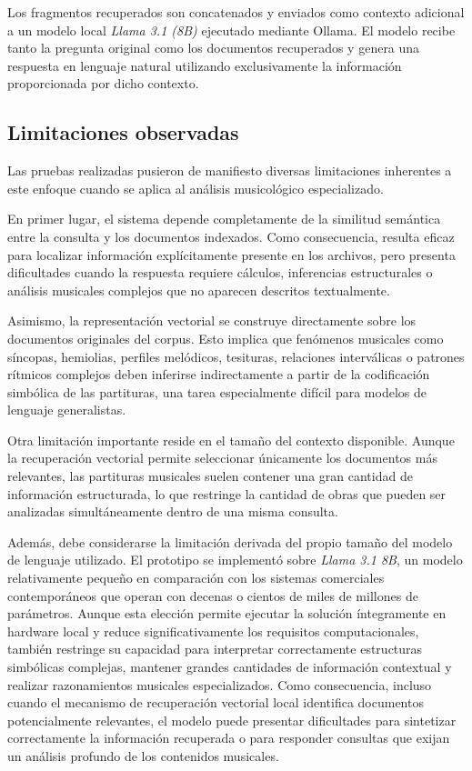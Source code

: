 Los fragmentos recuperados son concatenados y enviados como contexto adicional a un modelo local \textit{Llama 3.1 (8B)} ejecutado mediante Ollama. El modelo recibe tanto la pregunta original como los documentos recuperados y genera una respuesta en lenguaje natural utilizando exclusivamente la información proporcionada por dicho contexto.

\subsection{Limitaciones observadas}
Las pruebas realizadas pusieron de manifiesto diversas limitaciones inherentes a este enfoque cuando se aplica al análisis musicológico especializado.

En primer lugar, el sistema depende completamente de la similitud semántica entre la consulta y los documentos indexados. Como consecuencia, resulta eficaz para localizar información explícitamente presente en los archivos, pero presenta dificultades cuando la respuesta requiere cálculos, inferencias estructurales o análisis musicales complejos que no aparecen descritos textualmente.

Asimismo, la representación vectorial se construye directamente sobre los documentos originales del corpus. Esto implica que fenómenos musicales como síncopas, hemiolias, perfiles melódicos, tesituras, relaciones interválicas o patrones rítmicos complejos deben inferirse indirectamente a partir de la codificación simbólica de las partituras, una tarea especialmente difícil para modelos de lenguaje generalistas.

Otra limitación importante reside en el tamaño del contexto disponible. Aunque la recuperación vectorial permite seleccionar únicamente los documentos más relevantes, las partituras musicales suelen contener una gran cantidad de información estructurada, lo que restringe la cantidad de obras que pueden ser analizadas simultáneamente dentro de una misma consulta.

Además, debe considerarse la limitación derivada del propio tamaño del modelo de lenguaje utilizado. El prototipo se implementó sobre \textit{Llama 3.1 8B}, un modelo relativamente pequeño en comparación con los sistemas comerciales contemporáneos que operan con decenas o cientos de miles de millones de parámetros. Aunque esta elección permite ejecutar la solución íntegramente en hardware local y reduce significativamente los requisitos computacionales, también restringe su capacidad para interpretar correctamente estructuras simbólicas complejas, mantener grandes cantidades de información contextual y realizar razonamientos musicales especializados. Como consecuencia, incluso cuando el mecanismo de recuperación vectorial local identifica documentos potencialmente relevantes, el modelo puede presentar dificultades para sintetizar correctamente la información recuperada o para responder consultas que exijan un análisis profundo de los contenidos musicales.

